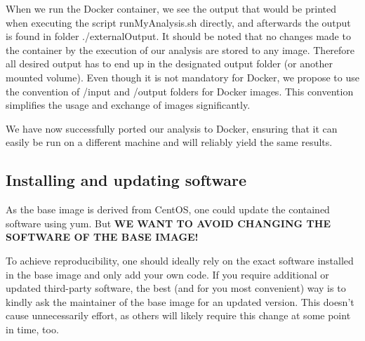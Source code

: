 \documentclass[a4paper, twoside, 11pt]{article}
\begin{document}
When we run the Docker container, we see the output that would be printed when 
executing the script runMyAnalysis.sh directly, and afterwards the output is found in folder ./externalOutput. 
It should be noted that no changes made to the container by the execution of our analysis 
are stored to any image. 
Therefore all desired output has to end up in the designated output folder (or another mounted volume). 
Even though it is not mandatory for Docker, 
we propose to use the convention of /input and /output folders for Docker images. 
This convention simplifies the usage and exchange of images significantly. 

We have now successfully ported our analysis to Docker, ensuring that it can easily be run  
on a different machine and will reliably yield the same results. 



\subsection{Installing and updating software}
\label{sec:installSoftware}
As the base image is derived from CentOS, one could update the contained software using yum. 
But \textbf{WE WANT TO AVOID CHANGING THE SOFTWARE OF THE BASE IMAGE!}

To achieve reproducibility, one should ideally rely on the exact software installed in the base image and only add your own code. 
If you require additional or updated third-party software, the best (and for you most convenient) way 
is to kindly ask the maintainer of the base image for an updated version. 
This doesn't cause unnecessarily effort, 
as others will likely require this change at some point in time, too. 
\end{document}
